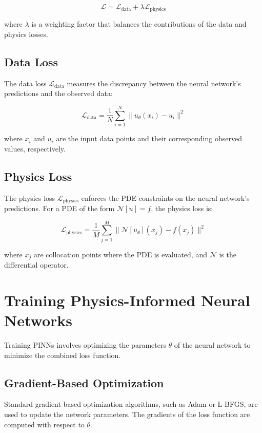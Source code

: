 \begin{equation}
\mathcal{L} = \mathcal{L}_\text{data} + \lambda \mathcal{L}_\text{physics}
\end{equation}

where \( \lambda \) is a weighting factor that balances the contributions of the data and physics losses.

\subsection{Data Loss}
The data loss \( \mathcal{L}_\text{data} \) measures the discrepancy between the neural network's predictions and the observed data:

\begin{equation}
\mathcal{L}_\text{data} = \frac{1}{N} \sum_{i=1}^{N} \| u_\theta(x_i) - u_i \|^2
\end{equation}

where \( x_i \) and \( u_i \) are the input data points and their corresponding observed values, respectively.

\subsection{Physics Loss}
The physics loss \( \mathcal{L}_\text{physics} \) enforces the PDE constraints on the neural network's predictions. For a PDE of the form \( \mathcal{N}[u] = f \), the physics loss is:

\begin{equation}
\mathcal{L}_\text{physics} = \frac{1}{M} \sum_{j=1}^{M} \| \mathcal{N}[u_\theta](x_j) - f(x_j) \|^2
\end{equation}

where \( x_j \) are collocation points where the PDE is evaluated, and \( \mathcal{N} \) is the differential operator.

\section{Training Physics-Informed Neural Networks}
Training PINNs involves optimizing the parameters \( \theta \) of the neural network to minimize the combined loss function.

\subsection{Gradient-Based Optimization}
Standard gradient-based optimization algorithms, such as Adam or L-BFGS, are used to update the network parameters. The gradients of the loss function are computed with respect to \( \theta \).

